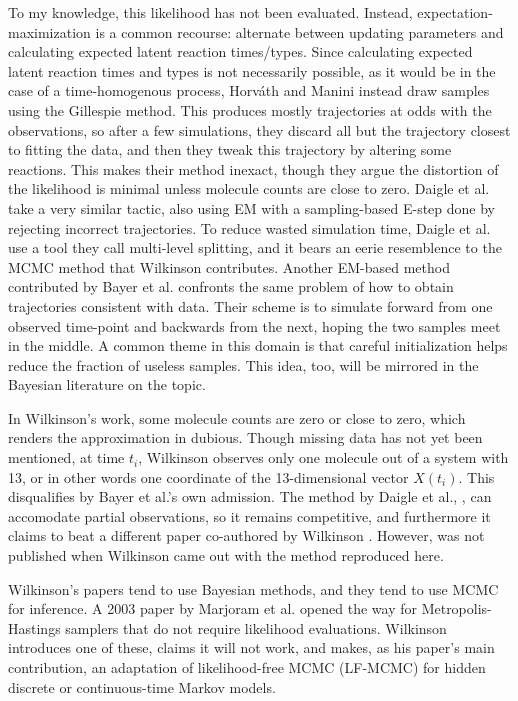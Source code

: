 \documentclass{article}
\begin{document}
To my knowledge, this likelihood has not been evaluated. Instead, expectation-maximization is a common recourse: alternate between updating parameters and calculating expected latent reaction times/types. Since calculating expected latent reaction times and types is not necessarily possible, as it would be in the case of a time-homogenous process, Horv\'ath and Manini \cite{horvath2008parameter} instead draw samples using the Gillespie method. This produces mostly trajectories at odds with the observations, so after a few simulations, they discard all but the trajectory closest to fitting the data, and then they tweak this trajectory by altering some reactions. This makes their method inexact, though they argue the distortion of the likelihood is minimal unless molecule counts are close to zero. Daigle et al. \cite{daigle2012accelerated} take a very similar tactic, also using EM with a sampling-based E-step done by rejecting incorrect trajectories. To reduce wasted simulation time, Daigle et al. use a tool they call multi-level splitting, and it bears an eerie resemblence to the MCMC method that Wilkinson contributes.  Another EM-based method contributed by Bayer et al. \cite{bayer2015stoch_em} confronts the same problem of how to obtain trajectories consistent with data. Their scheme is to simulate forward from one observed time-point and backwards from the next, hoping the two samples meet in the middle. A common theme in this domain is that careful initialization helps reduce the fraction of useless samples. This idea, too, will be mirrored in the Bayesian literature on the topic.

In Wilkinson's work, some molecule counts are zero or close to zero, which renders the approximation in \cite{horvath2008parameter} dubious. Though missing data has not yet been mentioned, at time $t_i$, Wilkinson observes only one molecule out of a system with 13, or in other words one coordinate of the 13-dimensional vector $X(t_i)$. This disqualifies \cite{bayer2015stoch_em} by Bayer et al.'s own admission. The method by Daigle et al., \cite{daigle2012accelerated}, can accomodate partial observations, so it remains competitive, and furthermore it claims to beat a different paper co-authored by Wilkinson \cite{Boys2008}. However, \cite{daigle2012accelerated} was not published when Wilkinson came out with the method reproduced here.

Wilkinson's papers tend to use Bayesian methods, and they tend to use MCMC for inference. A 2003 paper by Marjoram et al. \cite{Marjoram23122003} opened the way for Metropolis-Hastings samplers that do not require likelihood evaluations. Wilkinson introduces one of these, claims it will not work, and makes, as his paper's main contribution, an adaptation of likelihood-free MCMC (LF-MCMC) for hidden discrete or continuous-time Markov models.
\end{document}
